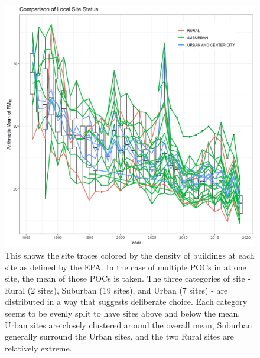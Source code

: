 \documentclass{article}
\begin{document}
\begin{figure}[ht]
    \centering
    \includegraphics[width = \textwidth]{Figures/SOCAB_metadata_Site_Status.png}
    \caption{This shows the site traces colored by the density of buildings at each site as defined by the EPA.  In the case of multiple \ac{POC}s in at one site, the mean of those \ac{POC}s is taken.  The three categories of site - Rural (2 sites), Suburban (19 sites), and Urban (7 sites) - are distributed in a way that suggests deliberate choice. Each category seems to be evenly split to have sites above and below the mean.  Urban sites are closely clustered around the overall mean, Suburban generally surround the Urban sites, and the two Rural sites are relatively extreme.  }
    \label{fig:SOCAB_metadata_Site_Status}
\end{figure}
\end{document}
